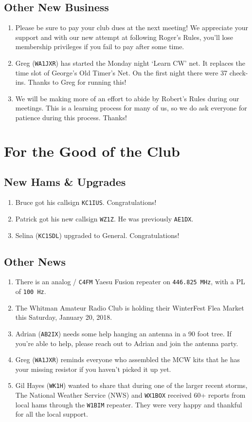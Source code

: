 \documentclass[10pt,letterpaper]{article}
\begin{document}
\subsection{Other New Business}
\begin{enumerate}
  \item Please be sure to pay your club dues at the next meeting! We appreciate your support and with our new attempt at following Roger's Rules, you'll lose membership privileges if you fail to pay after some time.
  \item Greg (\texttt{WA1JXR}) has started the Monday night `Learn CW' net. It replaces the time slot of George's Old Timer's Net. On the first night there were 37 check-ins. Thanks to Greg for running this!
  \item We will be making more of an effort to abide by Robert's Rules during our meetings. This is a learning process for many of us, so we do ask everyone for patience during this process. Thanks!
\end{enumerate}

\section{For the Good of the Club}

\subsection{New Hams \& Upgrades}
\begin{enumerate}
  \item Bruce got his callsign \texttt{KC1IUS}. Congratulations!
  \item Patrick got his new callsign \texttt{WZ1Z}. He was previously \texttt{AE1DX}.
  \item Selina (\texttt{KC1SDL}) upgraded to General. Congratulations!
\end{enumerate}

\subsection{Other News}
\begin{enumerate}
  \item There is an analog / \texttt{C4FM} Yaesu Fusion repeater on \texttt{446.825 MHz}, with a PL of \texttt{100 Hz}.
  \item The Whitman Amateur Radio Club is holding their WinterFest Flea Market this Saturday, January 20, 2018.
  \item Adrian (\texttt{AB2IX}) needs some help hanging an antenna in a 90 foot tree. If you're able to help, please reach out to Adrian and join the antenna party.
  \item Greg (\texttt{WA1JXR}) reminds everyone who assembled the MCW kits that he has your missing resistor if you haven't picked it up yet.
  \item Gil Hayes (\texttt{WK1H}) wanted to share that during one of the larger recent storms, The National Weather Service (NWS) and \texttt{WX1BOX} received 60+ reports from local hams through the \texttt{W1BIM} repeater. They were very happy and thankful for all the local support.
\end{enumerate}
\end{document}
